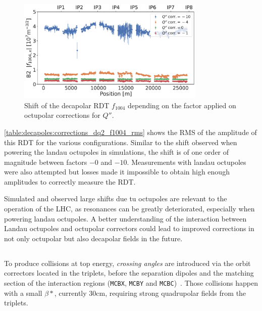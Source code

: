 \begin{figure}[!htb]
    \centering
    \includegraphics[width=0.8\textwidth]{./images/f1004/f1004x_mco_corr.pdf}
    \caption{Shift of the decapolar RDT $f_{1004}$ depending on the factor applied on octupolar
    corrections for $Q''$.}
    \label{decapoles:rdts:measured_f1004_mco}
\end{figure}


  
\cref{table:decapoles:corrections_dq2_f1004_rms} shows the RMS of the amplitude of this RDT for the 
various configurations. Similar to the shift observed when powering the landau octupoles in
simulations, the shift is of one order of magnitude between factors $-0$ and $-10$. Measurements
with landau octupoles were also attempted but losses made it impossible to obtain high enough
amplitudes to correctly measure the RDT.

Simulated and observed large shifts due tu octupoles are relevant to the operation of the LHC, as
resonances can be greatly deteriorated, especially when powering landau octupoles.
A better understanding of the interaction between Landau octupoles and octupolar correctors could
lead to improved corrections in not only octupolar but also decapolar fields in the future.




\subsection{}


To produce collisions at top energy, \textit{crossing angles} are introduced via the orbit
correctors located in the triplets, before the separation dipoles and the matching section of the
interaction regions (\texttt{MCBX}, \texttt{MCBY} and \texttt{MCBC})~\cite{de_maria_lhc_2008}. Those
collisions happen with a small $\beta*$, currently 30cm, requiring strong quadrupolar fields from
the triplets.

